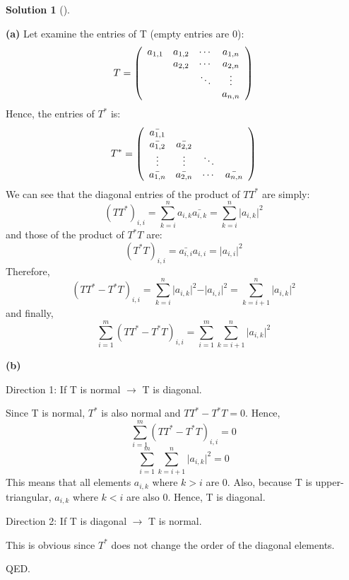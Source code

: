 \documentclass[numbers=enddot,12pt,final,onecolumn,notitlepage]{scrartcl}
\newcounter{sol}
\theoremstyle{definition}
\newtheorem{solu}[sol]{Solution}
\newenvironment{solution}[1][]
{\begin{solu}[#1]\begin{leftbar}}
        {\end{leftbar}\end{solu}}
\let\sumnonlimits\sum
\renewcommand{\sum}{\sumnonlimits\limits}
\begin{document}
\begin{solution}
	\textbf{(a)} Let examine the entries of T (empty entries are 0):
	\[
		T = \left(
		\begin{array}[c]{cccc}
				a_{1,1}  & a_{1,2}  & \cdots   & a_{1,n} \\
				\text{ } & a_{2,2}  & \cdots   & a_{2,n} \\
				\text{ } & \text{ } & \ddots   & \vdots  \\
				\text{ } & \text{ } & \text{ } & a_{n,n}
			\end{array}
		\right)
	\]
	Hence, the entries of $T^{\ast}$ is:
	\[
		T^{\ast} = \left(
		\begin{array}[c]{cccc}
				\bar{a_{1,1}} & \text{ }      & \text{ } & \text{ }      \\
				\bar{a_{1,2}} & \bar{a_{2,2}} & \text{ } & \text{ }      \\
				\vdots        & \vdots        & \ddots   & \text{ }      \\
				\bar{a_{1,n}} & \bar{a_{2,n}} & \cdots   & \bar{a_{n,n}}
			\end{array}
		\right)
	\]
	We can see that the diagonal entries of the product of $TT^{\ast}$ are simply:
	\[
		(TT^{\ast})_{i,i} = \sum_{k=i}^{n} a_{i,k} \bar{a_{i,k}} = \sum_{k=i}^{n} \vert a_{i,k} \vert^2
	\]
	and those of the product of $T^{\ast}T$ are:
	\[
		(T^{\ast}T)_{i,i} =  \bar{a_{i,i}} a_{i,i} = \vert a_{i,i} \vert^2
	\]
	Therefore,
	\[
		(TT^{\ast} - T^{\ast}T)_{i,i} = \sum_{k=i}^{n} \vert a_{i,k} \vert^2 - \vert a_{i,i} \vert^2 = \sum_{k=i+1}^{n} \vert a_{i,k} \vert^2
	\]
	and finally,
	\[
		\sum_{i=1}^{m} (TT^{\ast} - T^{\ast}T)_{i,i} = \sum_{i=1}^{m} \sum_{k=i+1}^{n} \vert a_{i,k} \vert^2
	\]

	\textbf{(b)}

	Direction 1: If T is normal $\rightarrow$ T is diagonal.

	Since T is normal, $T^{\ast}$ is also normal and $TT^{\ast} - T^{\ast}T = 0$. Hence,
	\[
		\sum_{i=1}^{m} (TT^{\ast} - T^{\ast}T)_{i,i} = 0
	\]
	\[
		\sum_{i=1}^{m} \sum_{k=i+1}^{n} \vert a_{i,k} \vert^2 = 0
	\]
	This means that all elements $a_{i,k}$ where $k > i$ are 0. Also, because T is upper-triangular, $a_{i,k}$ where $k < i$ are also 0. Hence, T is diagonal.

	Direction 2: If T is diagonal $\rightarrow$ T is normal.

	This is obvious since $T^{\ast}$ does not change the order of the diagonal elements.

	QED.

\end{solution}
\end{document}
